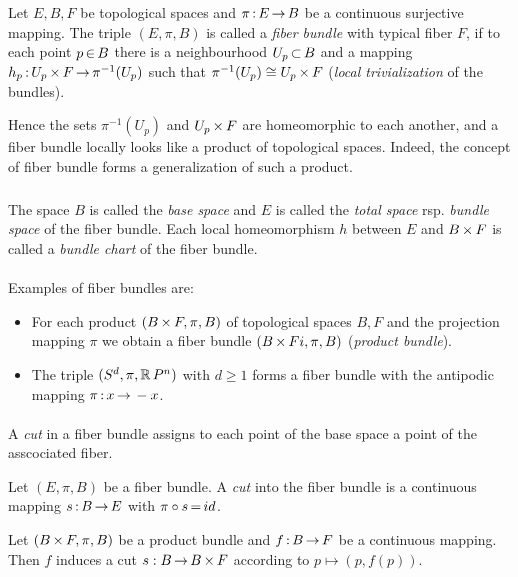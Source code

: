 \documentclass[11pt,twoside]{article}
\begin{document}
\begin{definition}
Let $E,B,F$ be topological spaces and
$\pi {\,:\,}E {\,\to\,} B$ be a continuous surjective mapping.
The triple $(E,\pi,B)$ is called a \textit{fiber bundle} with typical fiber $F$,
if to each point $p {\,\in\,} B$ there is a neighbourhood $U_p {\,\subset\,} B$
and a mapping $h_p{\,:\,} U_p {\,\times\,} F {\,\to\,} \pi^{-1}(U_p)$
such that $\pi^{-1}(U_p) \cong U_p {\,\times\,} F$
(\textit{local trivialization} of the bundles).
\end{definition}

Hence the sets $\pi^{-1}(U_p)$ and $U_p {\,\times\,} F$ are homeomorphic
to each another,
and a fiber bundle locally looks like a product of topological spaces.
Indeed,
the concept of fiber bundle forms a generalization of such a product.

\subparagraph{}
The space $B$ is called the \textit{base space}
and $E$ is called the \textit{total space} rsp. \textit{bundle space}
of the fiber bundle.
Each local homeomorphism $h$ between $E$ and $B {\,\times\,} F$ is called
a \textit{bundle chart} of the fiber bundle.

\paragraph{}
Examples of fiber bundles are:

\begin{itemize}[leftmargin=15pt]
\item[1.]
For each product $(B {\,\times\,} F,\pi,B)$ of topological spaces $B,F$
and the projection mapping $\pi$ we obtain a fiber bundle
$(B {\,\times\,} Fi,\pi,B)$ (\textit{product bundle}).
\item[2.]
The triple $(S^d,\pi,{\mathbb{R}}\,P^n)$ with $d \geq 1$ forms a fiber bundle
with the antipodic mapping $\pi {\,:\,} x {\,\to\,} -x$.
\end{itemize}

\paragraph{}
A \textit{cut} in a fiber bundle assigns to each point of the base space
a point of the asscociated fiber.

\begin{definition}
Let $(E,\pi,B)$ be a fiber bundle.
A \textit{cut} into the fiber bundle is a continuous mapping $s {\,:\,}B {\,\to\,} E$
with $\pi \circ s {\,=\,} id$.
\end{definition}

\begin{example}
Let $(B {\,\times\,} F,\pi,B)$ be a product bundle
and $f{\,:\,}B {\,\to\,} F$ be a continuous mapping.
Then $f$ induces a cut $s:B {\,\to\,} B {\,\times\,} F$ according to
$p \mapsto (p,f(p))$.
\end{example}
\end{document}

